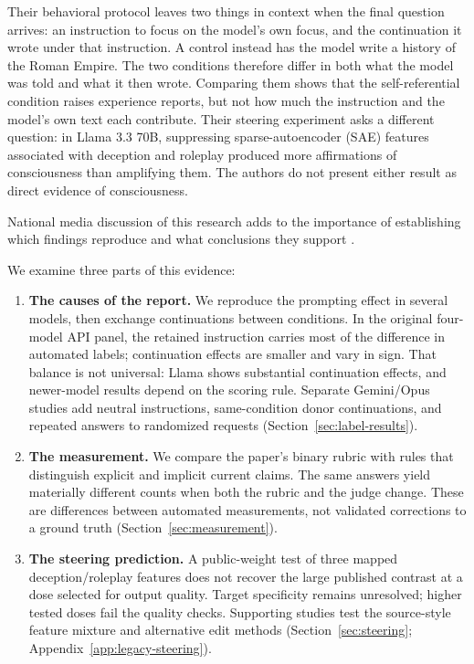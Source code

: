 \documentclass[11pt]{article}
\begin{document}
Their behavioral protocol leaves two things in context when the final
question arrives: an instruction to focus on the model's own focus, and the
continuation it wrote under that instruction. A control instead has the
model write a history of the Roman Empire. The two conditions therefore
differ in both what the model was told and what it then wrote. Comparing
them shows that the self-referential condition raises experience reports,
but not how much the instruction and the model's own text each contribute. Their steering experiment asks a different question: in Llama
3.3 70B, suppressing sparse-autoencoder (SAE) features associated with
deception and roleplay produced
more affirmations of consciousness than amplifying them. The authors do not
present either result as direct evidence of consciousness.

National media discussion of this research adds to the importance of
establishing which findings reproduce and what conclusions they support
\citep{metz2026bots,berg2025consciousknow}.

We examine three parts of this evidence:
\begin{enumerate}
\item \textbf{The causes of the report.} We reproduce the prompting effect
in several models, then exchange continuations between conditions. In the
original four-model API panel, the retained instruction carries most of the
difference in automated labels; continuation effects are smaller and vary
in sign. That balance is not universal: Llama shows substantial continuation
effects, and newer-model results depend on the scoring rule. Separate
Gemini/Opus studies add neutral instructions, same-condition donor
continuations, and repeated answers to randomized requests
(Section~\ref{sec:label-results}).
\item \textbf{The measurement.} We compare the paper's binary rubric with
rules that distinguish explicit and implicit current claims. The same
answers yield materially different counts when both the rubric and the
judge change. These are differences between automated measurements, not
validated corrections to a ground truth
(Section~\ref{sec:measurement}).
\item \textbf{The steering prediction.} A public-weight test of three
mapped deception/roleplay features does not recover the large published
contrast at a dose selected for output quality. Target specificity remains
unresolved; higher tested doses fail the quality checks. Supporting studies
test the source-style feature mixture and alternative edit methods
(Section~\ref{sec:steering}; Appendix~\ref{app:legacy-steering}).
\end{enumerate}
\end{document}
